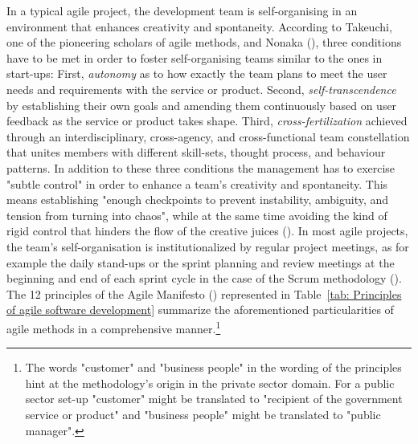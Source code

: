 In a typical agile project, the development team is self-organising in an environment that enhances creativity and spontaneity. According to Takeuchi, one of the pioneering scholars of agile methods, and Nonaka  (\cite*{TakeuchiI1986}), three conditions have to be met in order to foster self-organising teams similar to the ones in start-ups: First, \textit{autonomy} as to how exactly the team plans to meet the user needs and requirements with the service or product. Second, \textit{self-transcendence} by establishing their own goals and amending them continuously based on user feedback as the service or product takes shape. Third, \textit{cross-fertilization} achieved through an interdisciplinary, cross-agency, and cross-functional team constellation that unites members with different skill-sets, thought process, and behaviour patterns. In addition to these three conditions the management has to exercise "subtle control" in order to enhance a team's creativity and spontaneity. This means establishing "enough checkpoints to prevent instability, ambiguity, and tension from turning into chaos", while at the same time avoiding the kind of rigid control that hinders the flow of the creative juices (\cite{TakeuchiI1986}). In most agile projects, the team's self-organisation is institutionalized by regular project meetings, as for example the daily stand-ups or the sprint planning and review meetings at the beginning and end of each sprint cycle in the case of the Scrum methodology (\cite{Scrum.org2019}). The 12 principles of the Agile Manifesto (\cite*{AgileManifesto2001}) represented in Table~\ref{tab: Principles of agile software development} summarize the aforementioned particularities of agile methods in a comprehensive manner.\footnote{The words "customer" and "business people" in the wording of the principles hint at the methodology's origin in the private sector domain. For a public sector set-up "customer" might be translated to "recipient of the government service or product" and "business people" might be translated to "public manager".}
\begingroup
